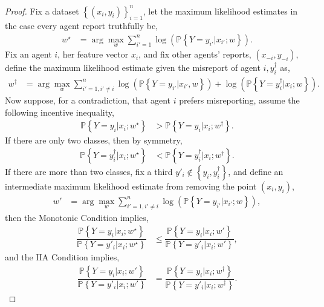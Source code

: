 \documentclass{article}
\begin{document}
\begin{proof} \label{proof:marginpf} 
Fix a dataset $\left\{\left(x_{i}, y_{i}\right)\right\}_{i=1}^{n}$, let the maximum likelihood estimates in the case every agent report truthfully be,
\begin{align*}
w^\star  &= \arg\displaystyle\max_{w} \displaystyle\sum_{i'=1}^{n} \log\left(\mathbb{P}\left\{Y = y_{i'} | x_{i'} ; w\right\}\right).
\end{align*}
Fix an agent $i $, her feature vector $x_{i}$, and fix other agents' reports, $\left(x_{-i}, y_{-i}\right)$, define the maximum likelihood estimate given the misreport of agent $i , y^{\dagger}_{i}$ as,
\begin{align*}
w^{\dagger} &= \arg\displaystyle\max_{w} \displaystyle\sum_{i'=1, i' \neq  i}^{n} \log\left(\mathbb{P}\left\{Y = y_{i'} | x_{i'}, w\right\}\right) + \log\left(\mathbb{P}\left\{Y = y^{\dagger}_{i} | x_{i} ; w\right\}\right).
\end{align*}
Now suppose, for a contradiction, that agent $i $ prefers misreporting, assume the following incentive inequality,
\begin{align*}
\mathbb{P}\left\{Y = y_{i} | x_{i} ; w^\star \right\} &> \mathbb{P}\left\{Y = y_{i} | x_{i} ; w^{\dagger}\right\}.
\end{align*}
If there are only two classes, then by symmetry,
\begin{align*}
\mathbb{P}\left\{Y = y^{\dagger}_{i} | x_{i} ; w^\star \right\} &< \mathbb{P}\left\{Y = y^{\dagger}_{i} | x_{i} ; w^{\dagger}\right\}.
\end{align*}
If there are more than two classes, fix a third $y'_{i} \notin \left\{y_{i}, y^{\dagger}_{i}\right\}$, and define an intermediate maximum likelihood estimate from removing the point $\left(x_{i}, y_{i}\right)$,
\begin{align*}
w' &= \arg\displaystyle\max_{w} \displaystyle\sum_{i'=1, i' \neq  i}^{n} \log\left(\mathbb{P}\left\{Y = y_{i'} | x_{i'} ; w\right\}\right),
\end{align*}
then the Monotonic Condition implies,
\begin{align*}
\dfrac{\mathbb{P}\left\{Y = y_{i} | x_{i} ; w^\star \right\}}{\mathbb{P}\left\{Y = y'_{i} | x_{i} ; w^\star \right\}} &\leq  \dfrac{\mathbb{P}\left\{Y = y_{i} | x_{i} ; w'\right\}}{\mathbb{P}\left\{Y = y'_{i} | x_{i} ; w'\right\}},
\end{align*}
and the IIA Condition implies,
\begin{align*}
\dfrac{\mathbb{P}\left\{Y = y_{i} | x_{i} ; w'\right\}}{\mathbb{P}\left\{Y = y'_{i} | x_{i} ; w'\right\}} &= \dfrac{\mathbb{P}\left\{Y = y_{i} | x_{i} ; w^{\dagger}\right\}}{\mathbb{P}\left\{Y = y'_{i} | x_{i} ; w^{\dagger}\right\}}.

\end{align*}
\end{proof}
\end{document}

